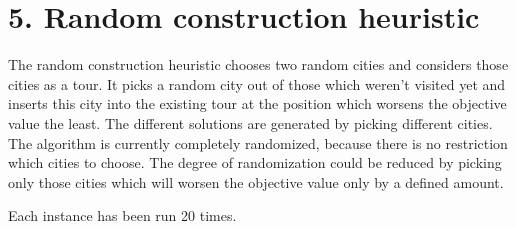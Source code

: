 \section*{5. Random construction heuristic}
The random construction heuristic chooses two random cities and considers those cities as a tour. It picks a random city out of those which weren't visited yet and inserts this city into the existing tour at the position which worsens the objective value the least. The different solutions are generated by picking different cities. The algorithm is currently completely randomized, because there is no restriction which cities to choose. The degree of randomization could be reduced by picking only those cities which will worsen the objective value only by a defined amount.

Each instance has been run 20 times.

